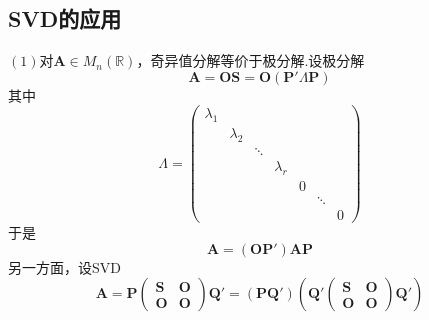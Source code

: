 \subsection{SVD的应用}
$(1)$对$\bm{A}\in M_n\left(\mathbb{R}\right)$，奇异值分解等价于极分解.设极分解\[
    \bm{A}=\bm{OS}=\bm{O}\left(
    \bm{P}'\bm{\varLambda}\bm{P}
    \right)
\]其中\[
    \bm{\varLambda}=\begin{pmatrix}
        \lambda_1 &           &        &           &   &        &   \\
                  & \lambda_2 &        &           &   &        &   \\
                  &           & \ddots &           &   &        &   \\
                  &           &        & \lambda_r &   &        &   \\
                  &           &        &           & 0 &        &   \\
                  &           &        &           &   & \ddots &   \\
                  &           &        &           &   &        & 0
    \end{pmatrix}
\]于是\[
    \bm{A}=\left(
    \bm{OP}'
    \right)\bm{AP}
\]
另一方面，设SVD\[
    \bm{A}=\bm{P}\begin{pmatrix}
        \bm{S} & \bm{O} \\
        \bm{O} & \bm{O}
    \end{pmatrix}\bm{Q}'=\left(
    \bm{PQ}'
    \right)\left(
    \bm{Q}'\begin{pmatrix}
        \bm{S} & \bm{O} \\
        \bm{O} & \bm{O}
    \end{pmatrix}\bm{Q}'
    \right)
\]


